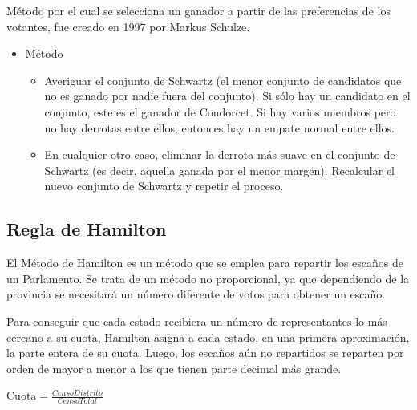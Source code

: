 \documentclass[12pt,a4paper,]{book}
\def\ifdoblecara{} %
\def\ifprincipal{} %
\providecommand{\tightlist}{%
  \setlength{\itemsep}{0pt}\setlength{\parskip}{0pt}}
\numberwithin{dummy}{section}
\theoremstyle{ocrenumbox}
\theoremstyle{blacknumex}
\theoremstyle{blacknumbox}
\theoremstyle{ocrenum}
\theoremstyle{ocrenum}
\begin{document}
Método por el cual se selecciona un ganador a partir de las preferencias
de los votantes, fue creado en 1997 por Markus Schulze.

\begin{itemize}
\item
  Método

  \begin{itemize}
  \tightlist
  \item
    Averiguar el conjunto de Schwartz (el menor conjunto de candidatos
    que no es ganado por nadie fuera del conjunto). Si sólo hay un
    candidato en el conjunto, este es el ganador de Condorcet. Si hay
    varios miembros pero no hay derrotas entre ellos, entonces hay un
    empate normal entre ellos.
  \item
    En cualquier otro caso, eliminar la derrota más suave en el conjunto
    de Schwartz (es decir, aquella ganada por el menor margen).
    Recalcular el nuevo conjunto de Schwartz y repetir el proceso.
  \end{itemize}
\end{itemize}

\hypertarget{regla-de-hamilton}{%
\subsection{Regla de Hamilton}\label{regla-de-hamilton}}

El Método de Hamilton es un método que se emplea para repartir los
escaños de un Parlamento. Se trata de un método no proporcional, ya que
dependiendo de la provincia se necesitará un número diferente de votos
para obtener un escaño.

Para conseguir que cada estado recibiera un número de representantes lo
más cercano a su cuota, Hamilton asigna a cada estado, en una primera
aproximación, la parte entera de su cuota. Luego, los escaños aún no
repartidos se reparten por orden de mayor a menor a los que tienen parte
decimal más grande.

\(\textrm{Cuota} = \frac{Censo Distrito}{Censo Total}\)

\FloatBarrier

\ifdefined\ifprincipal
\else
\setlength{\parindent}{1em}
\pagestyle{fancy}
\setcounter{tocdepth}{4}
\tableofcontents

\fi

\ifdefined\ifdoblecara
\fancyhead{}{}
\fancyhead[LE,RO]{\scriptsize\rightmark}
\fancyfoot[LO,RE]{\scriptsize\slshape \leftmark}
\fancyfoot[C]{}
\fancyfoot[LE,RO]{\footnotesize\thepage}
\else
\fancyhead{}{}
\fancyhead[RO]{\scriptsize\rightmark}
\fancyfoot[LO]{\scriptsize\slshape \leftmark}
\fancyfoot[C]{}
\fancyfoot[RO]{\footnotesize\thepage}
\fi
\renewcommand{\headrulewidth}{0.4pt}
\renewcommand{\footrulewidth}{0.4pt}
\end{document}
